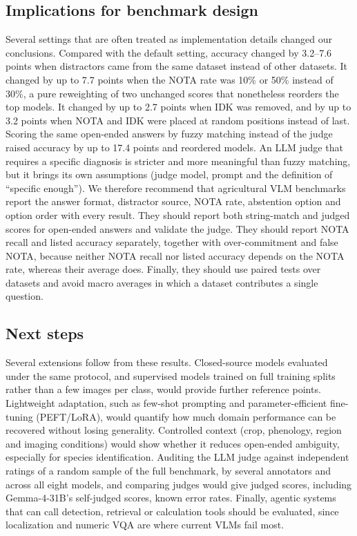\documentclass[10pt,letterpaper]{article}
\newcommand{\newtext}[1]{#1}
\begin{document}
\subsection{Implications for benchmark design}
Several settings that are often treated as implementation details changed our conclusions. Compared with the default setting, accuracy changed by 3.2--7.6 points when distractors came from the same dataset instead of other datasets. It changed by up to 7.7 points when the NOTA rate was 10\% or 50\% instead of 30\%, a pure reweighting of two unchanged scores that nonetheless reorders the top models. It changed by up to 2.7 points when IDK was removed, and by up to 3.2 points when NOTA and IDK were placed at random positions instead of last. Scoring the same open-ended answers by fuzzy matching instead of the judge raised accuracy by up to 17.4 points and reordered models. An LLM judge that requires a specific diagnosis is stricter and more meaningful than fuzzy matching, but it brings its own assumptions (judge model, prompt and the definition of ``specific enough''). We therefore recommend that agricultural VLM benchmarks report the answer format, distractor source, NOTA rate, abstention option and option order with every result. They should report both string-match and judged scores for open-ended answers and validate the judge. They should report NOTA recall and listed accuracy separately, together with over-commitment and false NOTA, because neither NOTA recall nor listed accuracy depends on the NOTA rate, whereas their average does. Finally, they should use paired tests over datasets and avoid macro averages in which a dataset contributes a single question.

\subsection{Next steps}
\label{sec:next_experiments}
Several extensions follow from these results. Closed-source models evaluated under the same protocol, and supervised models trained on full training splits rather than a few images per class, would provide further reference points. Lightweight adaptation, such as few-shot prompting and parameter-efficient fine-tuning (PEFT/LoRA), would quantify how much domain performance can be recovered without losing generality. Controlled context (crop, phenology, region and imaging conditions) would show whether it reduces open-ended ambiguity, especially for species identification. \newtext{Auditing the LLM judge against independent ratings of a random sample of the full benchmark, by several annotators and across all eight models,} and comparing judges would give judged scores, including Gemma-4-31B's self-judged scores, known error rates. Finally, agentic systems that can call detection, retrieval or calculation tools should be evaluated, since localization and numeric VQA are where current VLMs fail most.
\end{document}
